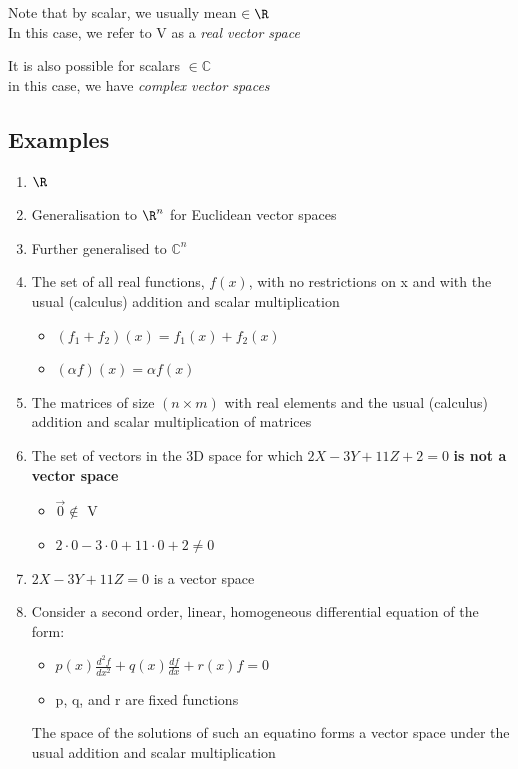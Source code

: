 \documentclass[a4paper, 11pt, normalem]{report}
\begin{document}
Note that by scalar, we usually mean $\in \R$ \\
In this case, we refer to V as a \emph{real vector space}

It is also possible for scalars $\in \mathbb{C}$ \\
in this case, we have \emph{complex vector spaces}

\subsection{Examples}
\begin{enumerate}
    \item $\R$
    \item Generalisation to $\R^n$ for Euclidean vector spaces
    \item Further generalised to $\mathbb{C}^n$
    \item The set of all real functions, $f(x)$, with no restrictions on x and with the usual (calculus) addition and scalar multiplication
        \begin{itemize}
            \item $(f_1 + f_2 )(x) = f_{1}(x) + f_{2}(x)$
            \item $(\alpha f)(x) = \alpha f(x)$
        \end{itemize}
    \item The matrices of size $(n \times m)$ with real elements and the usual (calculus) addition and scalar multiplication of matrices
    \item The set of vectors in the 3D space for which $2X - 3Y + 11Z + 2 = 0$ \textbf{is not a vector space}
        \begin{itemize}
            \item $\vec{0} \notin$ V
            \item $2\cdot0 - 3\cdot0 + 11\cdot0 + 2 \neq 0$
        \end{itemize}
    \item $2X - 3Y + 11Z = 0$ is a vector space
    \item Consider a second order, linear, homogeneous differential equation of the form:
        \begin{itemize}
            \item $p(x)\frac{d^{2}f}{dx^2} + q(x)\frac{df}{dx} + r(x)f = 0$
            \item p, q, and r are fixed functions
        \end{itemize}
        The space of the solutions of such an equatino forms a vector space under the usual addition and scalar multiplication
\end{enumerate}
\end{document}
